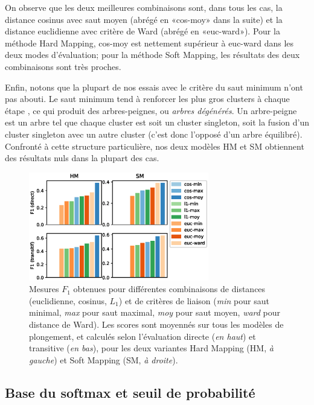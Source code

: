 On observe que les deux meilleures combinaisons sont, dans tous les cas, la distance cosinus avec saut moyen (abrégé en «cos-moy» dans la suite) et la distance euclidienne avec critère de Ward (abrégé en «euc-ward»). Pour la méthode Hard Mapping, cos-moy est nettement supérieur à euc-ward dans les deux modes d'évaluation; pour la méthode Soft Mapping, les résultats des deux combinaisons sont très proches. 

Enfin, notons que la plupart de nos essais avec le critère du saut minimum n'ont pas abouti. Le saut minimum tend à renforcer les plus gros clusters à chaque étape \cite{everitt2011cluster}, ce qui produit des arbres-peignes, ou \textit{arbres dégénérés}. Un arbre-peigne est un arbre tel que chaque cluster est soit un cluster singleton, soit la fusion d'un cluster singleton avec un autre cluster (c'est donc l'opposé d'un arbre équilibré). Confronté à cette structure particulière, nos deux modèles HM et SM obtiennent des résultats nuls dans la plupart des cas.


\begin{figure}[h]
    \centering
    \includegraphics[width=0.7\textwidth]{fig/plot/taxex_cluparams-all.eps}
    \caption[Influence des paramètres de regroupement sur l'extraction de taxonomie]{Mesures $F_1$ obtenues pour différentes combinaisons de distances (euclidienne, cosinus, $L_1$) et de critères de liaison (\textit{min} pour saut minimal, \textit{max} pour saut maximal, \textit{moy} pour saut moyen, \textit{ward} pour distance de Ward). Les scores sont moyennés sur tous les modèles de plongement, et calculés selon l'évaluation directe (\textit{en haut}) et transitive (\textit{en bas}), pour les deux variantes Hard Mapping (HM, \textit{à gauche}) et Soft Mapping (SM, \textit{à droite}).}
    \label{fig:taxex-cluparams-all}
\end{figure}

\subsection{Base du softmax et seuil de probabilité}
\label{subsec:te-hp-softmapping}

